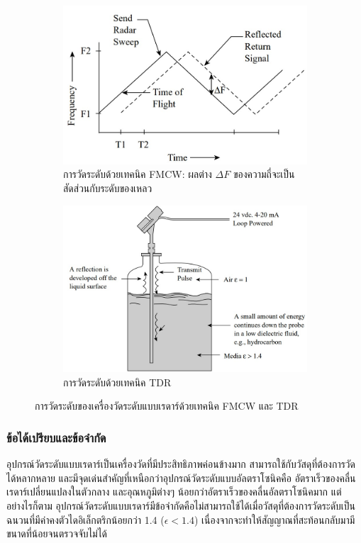 \documentclass[final,11pt]{article}
\begin{document}
\begin{figure}
    \begin{subfigure}[b]{0.4\textwidth}
        \centering
        \includegraphics[width=\textwidth]{images/Screenshot_19.jpg}
        \caption{การวัดระดับด้วยเทคนิค FMCW: ผลต่าง $\Delta F$ ของความถี่จะเป็นสัดส่วนกับระดับของเหลว}
        \label{fig:rtl1}
    \end{subfigure}
    \hfill
    \begin{subfigure}[b]{0.6\textwidth}
        \centering
        \includegraphics[width=\textwidth]{images/Screenshot_18.jpg}
        \caption{การวัดระดับด้วยเทคนิค TDR}
        \label{fig:rtl2}
    \end{subfigure}
    \hfill
    \caption{การวัดระดับของเครื่องวัดระดับแบบเรดาร์ด้วยเทคนิค FMCW และ TDR}
    \label{fig:rtl}
\end{figure}

\subsubsection{ข้อได้เปรียบและข้อจำกัด}
อุปกรณ์วัดระดับแบบเรดาร์เป็นเครื่องวัดที่มีประสิทธิภาพค่อนข้างมาก สามารถใช้กับวัสดุที่ต้องการวัดได้หลากหลาย และมีจุดเด่นสำคัญที่เหนือกว่าอุปกรณ์วัดระดับแบบอัลตราโซนิคคือ
อัตราเร็วของคลื่นเรดาร์เปลี่ยนแปลงในตัวกลาง และอุณหภูมิต่างๆ น้อยกว่าอัตราเร็วของคลื่นอัลตราโซนิคมาก แต่อย่างไรก็ตาม 
อุปกรณ์วัดระดับแบบเรดาร์มีข้อจำกัดคือไม่สามารถใช้ได้เมื่อวัสดุที่ต้องการวัดระดับเป็นฉนวนที่มีค่าคงตัวไดอิเล็กตริกน้อยกว่า 1.4 ($\epsilon < 1.4$) 
เนื่องจากจะทำให้สัญญาณที่สะท้อนกลับมามีขนาดที่น้อยจนตรวจจับไม่ได้
\end{document}
